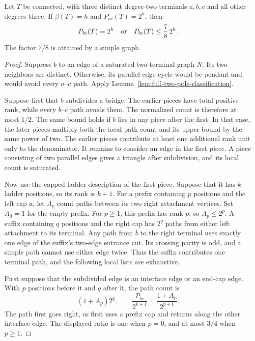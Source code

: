 \begin{lemma}\label{lem:one-full-three-pole-gap}
Let $T$ be connected, with three distinct degree-two terminals $a,b,c$ and all other degrees three.
If $\beta(T)=h$ and $P_{ac}(T)=2^h$, then
\[
 P_{bc}(T)=2^h
 \quad\hbox{or}\quad
 P_{bc}(T)\le\frac78\,2^h.
\]
The factor $7/8$ is attained by a simple graph.
\end{lemma}

\begin{proof}
Suppress $b$ to an edge of a saturated two-terminal graph $N$.
Its two neighbors are distinct.
Otherwise, its parallel-edge cycle would be pendant and would avoid every $a$--$c$ path.
Apply Lemma~\ref{lem:full-two-pole-classification}.

Suppose first that $b$ subdivides a bridge.
The earlier pieces have total positive rank, while every $b$--$c$ path avoids them.
The normalized count is therefore at most $1/2$.
The same bound holds if $b$ lies in any piece after the first.
In that case, the later pieces multiply both the local path count and its upper bound by the same power of two.
The earlier pieces contribute at least one additional rank unit only to the denominator.
It remains to consider an edge in the first piece.
A piece consisting of two parallel edges gives a triangle after subdivision, and its local count is saturated.

Now use the capped ladder description of the first piece.
Suppose that it has $k$ ladder positions, so its rank is $k+1$.
For a prefix containing $p$ positions and the left cap $a$, let $A_p$ count paths between its two right attachment vertices.
Set $A_0=1$ for the empty prefix.
For $p\ge1$, this prefix has rank $p$, so $A_p\le2^p$.
A suffix containing $q$ positions and the right cap has $2^q$ paths from either left attachment to its terminal.
Any path from $b$ to the right terminal uses exactly one edge of the suffix's two-edge entrance cut.
Its crossing parity is odd, and a simple path cannot use either edge twice.
Thus the suffix contributes one terminal path, and the following local lists are exhaustive.

First suppose that the subdivided edge is an interface edge or an end-cap edge.
With $p$ positions before it and $q$ after it, the path count is
\[
 (1+A_p)2^q,
 \qquad
 \frac{P_{bc}}{2^{k+1}}=\frac{1+A_p}{2^{p+1}}.
\]
The path first goes right, or first uses a prefix cap and returns along the other interface edge.
The displayed ratio is one when $p=0$, and at most $3/4$ when $p\ge1$.


\end{proof}
